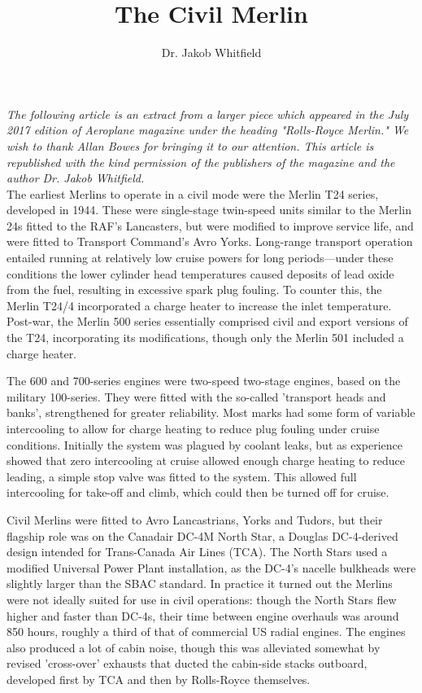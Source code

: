 %


\title{The Civil Merlin} 
\author{Dr. Jakob Whitfield}
\maketitle

\textit{The following article is an extract from a larger piece which appeared
in the July 2017 edition of Aeroplane magazine under the heading
"Rolls-Royce Merlin."  We wish to thank Allan Bowes for bringing it to
our attention. This article is republished with the kind permission of
the publishers of the magazine and the author Dr. Jakob Whitfield.}\\


The earliest Merlins to operate in a civil mode were the Merlin T24 series,
developed in 1944. These were single-stage twin-speed units similar to the
Merlin 24s fitted to the RAF's Lancasters, but were modified to improve service
life, and were fitted to Transport Command's Avro Yorks. Long-range transport
operation entailed running at relatively low cruise powers for long
periods---under these conditions the lower cylinder head temperatures caused
deposits of
lead oxide from the fuel, resulting in excessive spark plug fouling. To counter
this, the Merlin T24/4 incorporated a charge heater to increase the inlet
temperature. Post-war, the Merlin 500 series essentially comprised civil and
export versions of the T24, incorporating its modifications, though only the
Merlin 501 included a charge heater.

The 600 and 700-series engines were two-speed two-stage engines, based on the
military 100-series. They were fitted with the so-called 'transport heads and
banks', strengthened for greater reliability. Most marks had some form of
variable intercooling to allow for charge heating to reduce plug fouling under
cruise conditions. Initially the system was plagued by coolant leaks, but as
experience showed that zero intercooling at cruise allowed enough charge
heating to reduce leading, a simple stop valve was fitted to the system. This
allowed full intercooling for take-off and climb, which could then be turned
off for cruise. 

Civil Merlins were fitted to Avro Lancastrians, Yorks and Tudors, but their
flagship role was on the Canadair DC-4M North Star, a Douglas DC-4-derived
design intended for Trans-Canada Air Lines (TCA). The North Stars used a
modified Universal Power Plant installation, as the DC-4's nacelle bulkheads
were slightly larger than the SBAC standard. In practice it turned out the
Merlins were not ideally suited for use in civil operations: though the North
Stars flew higher and faster than DC-4s, their time between engine overhauls
was around 850 hours, roughly a third of that of commercial US radial engines.
The engines also produced a lot of cabin noise, though this was alleviated
somewhat by revised 'cross-over' exhausts that ducted the cabin-side stacks
outboard, developed first by TCA and then by Rolls-Royce themselves.

